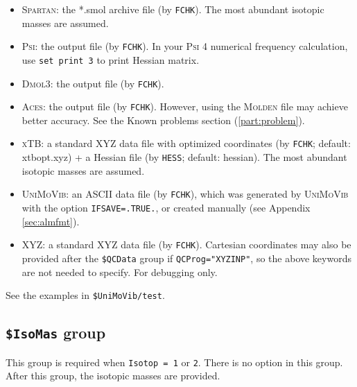 \documentclass[12pt,english]{extarticle}
\begin{document}
\begin{itemize}
\item \textsc{Spartan}: the *.smol archive file (by \verb|FCHK|). The most abundant isotopic masses are assumed.
\item \textsc{Psi}: the output file (by \verb|FCHK|). In your \textsc{Psi} 4 numerical frequency calculation, use \texttt{set print 3} to print Hessian matrix.
\item \textsc{Dmol3}: the output file (by \verb|FCHK|).
\item \textsc{Aces}: the output file (by \verb|FCHK|). However, using the \textsc{Molden} file may achieve better accuracy. See the Known problems section (\ref{part:problem}).
\item \textsc{xTB}: a standard XYZ data file with optimized coordinates (by \verb|FCHK|; default: xtbopt.xyz) + a Hessian file (by \verb|HESS|; default: hessian). The most abundant isotopic masses are assumed.
\item \textsc{UniMoVib}: an ASCII data file (by \verb|FCHK|), which was generated by \textsc{UniMoVib} with the option \verb|IFSAVE=.TRUE.|, or created manually (see Appendix \ref{sec:almfmt}).
\item XYZ: a standard XYZ data file (by \verb|FCHK|). Cartesian coordinates may also be provided after the \texttt{\$QCData} group if \verb|QCProg="XYZINP"|, so the above keywords are not needed to specify. For debugging only.
\end{itemize}

See the examples in \verb|$UniMoVib/test|.


\subsection{\texttt{\$IsoMas} group} \label{sec:inp-isomas}

This group is required when \verb|Isotop = 1| or \verb|2|. There is no option in
this group. After this group, the isotopic masses are provided.
\end{document}
